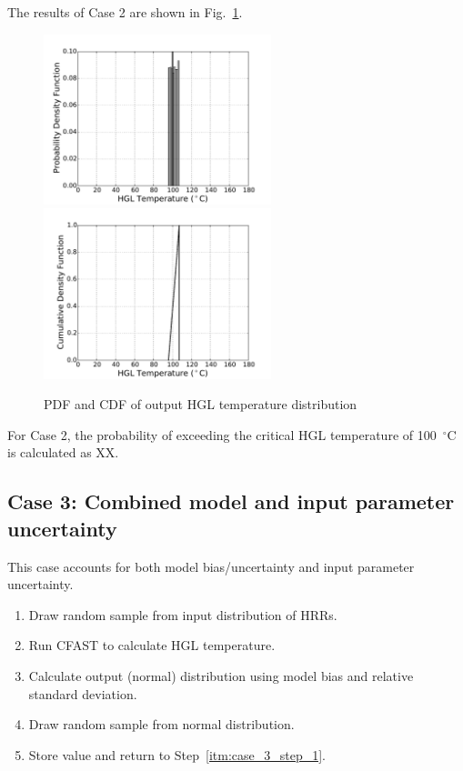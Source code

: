 \documentclass[12pt]{article}
\begin{document}
The results of Case 2 are shown in Fig.~\ref{fig:case_2_output_distributions}.

\begin{figure}[!ht]
\includegraphics[width=2.6in]{Figures/output_PDF_2_input}
\includegraphics[width=2.6in]{Figures/output_CDF_2_input}
\caption{PDF and CDF of output HGL temperature distribution}
\label{fig:case_2_output_distributions}
\end{figure}

For Case 2, the probability of exceeding the critical HGL temperature of 100~$^\circ$C is calculated as XX.


\clearpage


\subsection{Case 3: Combined model and input parameter uncertainty}

This case accounts for both model bias/uncertainty and input parameter uncertainty.

\begin{enumerate}
\item Draw random sample from input distribution of HRRs.
\label{itm:case_3_step_1}
\item Run CFAST to calculate HGL temperature.
\item Calculate output (normal) distribution using model bias and relative standard deviation.
\item Draw random sample from normal distribution.
\item Store value and return to Step~\ref{itm:case_3_step_1}.
\end{enumerate}
\end{document}

